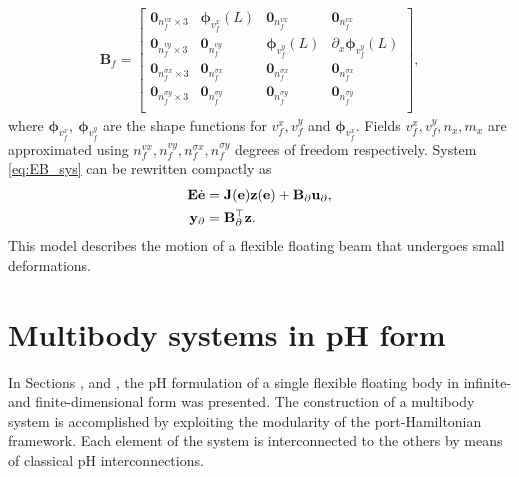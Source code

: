 \begin{align*}
\mathbf{B}_{f} = \begin{bmatrix}
\mathbf{0}_{n_f^{vx} \times 3} & \bm{\phi}_{v_f^x}(L) & \mathbf{0}_{n_f^{vx}} & \mathbf{0}_{n_f^{vx}} \\
\mathbf{0}_{n_f^{vy} \times 3} & \mathbf{0}_{n_f^{vy}} & \bm{\phi}_{v_f^y}(L) & \partial_x \bm{\phi}_{v_f^y}(L) \\
\mathbf{0}_{n_f^{\sigma x} \times 3} & \mathbf{0}_{n_f^{\sigma x}} & \mathbf{0}_{n_f^{\sigma x}} & \mathbf{0}_{n_f^{\sigma x}} \\
\mathbf{0}_{n_f^{\sigma y} \times 3} & \mathbf{0}_{n_f^{\sigma y}} & \mathbf{0}_{n_f^{\sigma y}} & \mathbf{0}_{n_f^{\sigma y}} \\
\end{bmatrix},
\end{align*}
where $\bm{\phi}_{v_f^x}, \ \bm{\phi}_{v_f^y}$ are the shape functions for ${v}_f^x, {v}_f^y$ and $\bm{\phi}_{v_f^x}$. Fields ${v}_f^x, {v}_f^y, n_x, m_x$ are approximated using $n_f^{vx}, n_f^{vy}, n_f^{\sigma x}, n_f^{\sigma y}$ degrees of freedom respectively. System \eqref{eq:EB_sys} can be rewritten compactly as
\begin{equation}
\label{eq:beam_discr}
\begin{aligned}
\mathbf{E} \dot{\mathbf{e}} &= \mathbf{J}(\mathbf{e}) \mathbf{z}(\mathbf{e}) + \mathbf{B}_\partial \mathbf{u}_\partial, \vspace{2mm} \\
\mathbf{y}_\partial &= \mathbf{B}_\partial^{\top}  \mathbf{z}. \\
\end{aligned}
\end{equation}
This model describes the motion of a flexible floating beam that undergoes small deformations. 

\section{Multibody systems in pH form}
\label{sec:MB_pH}
In Sections , and , the pH formulation of a single flexible floating body in infinite- and finite-dimensional form was presented. The construction of a multibody system is accomplished by exploiting the modularity of the port-Hamiltonian framework. Each element of the system is interconnected to the others by means of classical pH interconnections.

